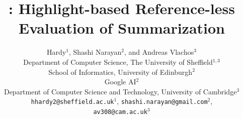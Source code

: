 \documentclass[11pt,a4paper]{article}
\title{\highres: Highlight-based Reference-less Evaluation of Summarization}
\author{Hardy$^1$, Shashi Narayan$^2$, \textnormal{and} Andreas Vlachos$^3$ \\
  Department of Computer Science, The University of Sheffield$^{1,3}$ \\
  School of Informatics, University of Edinburgh$^{2}$\\
  Google AI$^{2}$ \\
  Department of Computer Science and Technology, University of Cambridge$^{3}$ \\
  \texttt{hhardy2@sheffield.ac.uk}$^1$, \texttt{shashi.narayan@gmail.com}$^2$, \\ \texttt{av308@cam.ac.uk}$^3$ \\}
\date{}
\begin{document}
\maketitle
\begin{abstract}
  
  

\end{abstract}
\end{document}
